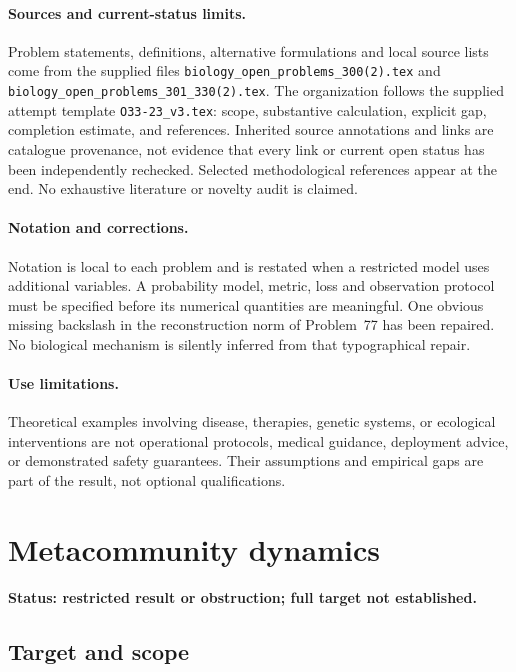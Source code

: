 \documentclass[11pt]{article}
\begin{document}
\paragraph{Sources and current-status limits.}
Problem statements, definitions, alternative formulations and local source lists
come from the supplied files
\texttt{biology\_open\_problems\_300(2).tex} and
\texttt{biology\_open\_problems\_301\_330(2).tex}.
The organization follows the supplied attempt template
\texttt{O33-23\_v3.tex}: scope, substantive calculation, explicit gap,
completion estimate, and references. Inherited source annotations and links are
catalogue provenance, not evidence that every link or current open status has
been independently rechecked. Selected methodological references appear at the
end. No exhaustive literature or novelty audit is claimed.

\paragraph{Notation and corrections.}
Notation is local to each problem and is restated when a restricted model uses
additional variables. A probability model, metric, loss and observation protocol
must be specified before its numerical quantities are meaningful. One obvious
missing backslash in the reconstruction norm of Problem~77 has been repaired.
No biological mechanism is silently inferred from that typographical repair.

\paragraph{Use limitations.}
Theoretical examples involving disease, therapies, genetic systems, or ecological
interventions are not operational protocols, medical guidance, deployment advice,
or demonstrated safety guarantees. Their assumptions and empirical gaps are part
of the result, not optional qualifications.


\section*{Metacommunity dynamics}
\label{prob:196}
\noindent\textbf{Status: restricted result or obstruction; full target not established.}
\subsection{Target and scope}
\end{document}
